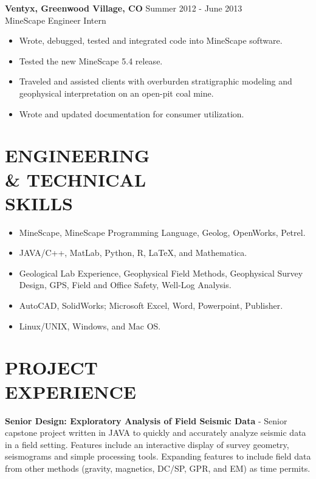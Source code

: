 \documentclass[margin]{res}
\begin{document}
\begin{resume}
			\textbf{Ventyx, Greenwood Village, CO} \hfill Summer 2012 - June 2013 \\
			MineScape Engineer Intern
                   \begin{itemize} %
                    \item Wrote, debugged, tested and integrated code into MineScape software.
                    \item Tested the new MineScape 5.4 release.
                    \item Traveled and assisted clients with overburden stratigraphic modeling and \\geophysical interpretation on an 							open-pit coal mine.
                    \item Wrote and updated documentation for consumer utilization.
				   \end{itemize} 

\section{ENGINEERING \\ \& TECHNICAL \\ SKILLS} 
		\begin{itemize}
		\item MineScape, MineScape Programming Language, Geolog, OpenWorks, Petrel.
		\item JAVA/C++, MatLab, Python, R, LaTeX, and Mathematica.
		\item Geological Lab Experience, Geophysical Field Methods, Geophysical Survey \\ Design, GPS, Field and Office Safety, Well-Log Analysis.
		\item AutoCAD, SolidWorks; Microsoft Excel, Word, Powerpoint, Publisher.
		\item Linux/UNIX, Windows, and Mac OS.
		\end{itemize}
		
\section{PROJECT \\ EXPERIENCE}
            \textbf{Senior Design: Exploratory Analysis of Field Seismic Data} - Senior capstone project written in JAVA to quickly and accurately analyze seismic data in a field setting. Features include an interactive display of survey geometry, seismograms and simple processing tools. Expanding features to include field data from other methods (gravity, magnetics, DC/SP, GPR, and EM) as time permits.
			 

\end{resume}
\end{document}

